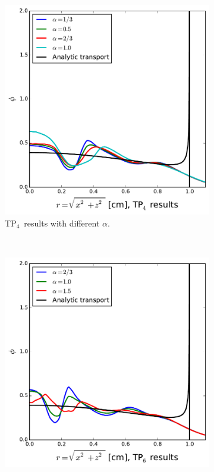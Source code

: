\documentclass[review]{elsarticle}
\begin{document}
{\begin{figure}[ht!]
\begin{subfigure}{.5\textwidth}
		\begin{center}
			\hspace*{0cm}\includegraphics[width=1.\textwidth]{tp4-line.pdf}
			\caption[]{TP$_4$\ results with different $\alpha$.}%
			\label{f:tp4-line}
		\end{center}
	\end{subfigure}
	~
	\begin{subfigure}{.5\textwidth}
		\begin{center}
			\hspace*{-1cm}\includegraphics[width=1.\textwidth]{tp6-line.pdf}

\end{center}
\end{subfigure}
\end{figure}}
\end{document}
